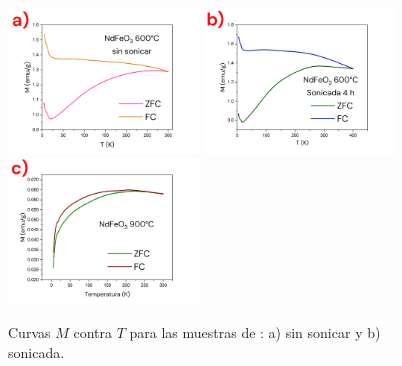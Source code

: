 \documentclass[../main.tex]{subfiles}
\begin{document}
\begin{figure}[H]
    \centering
    \includegraphics[width=0.45\textwidth]{fig/MvTNd.png}
    \quad
    \includegraphics[width=0.45\textwidth]{fig/MvTNd-S.png}
    \includegraphics[width=0.45\textwidth]{fig/MvTNd900.png}
    \caption{Curvas $M$ contra $T$ para las muestras de \neod{}: a) sin sonicar y b) sonicada.}
    \label{fig:MvTNd}
\end{figure}
\end{document}
